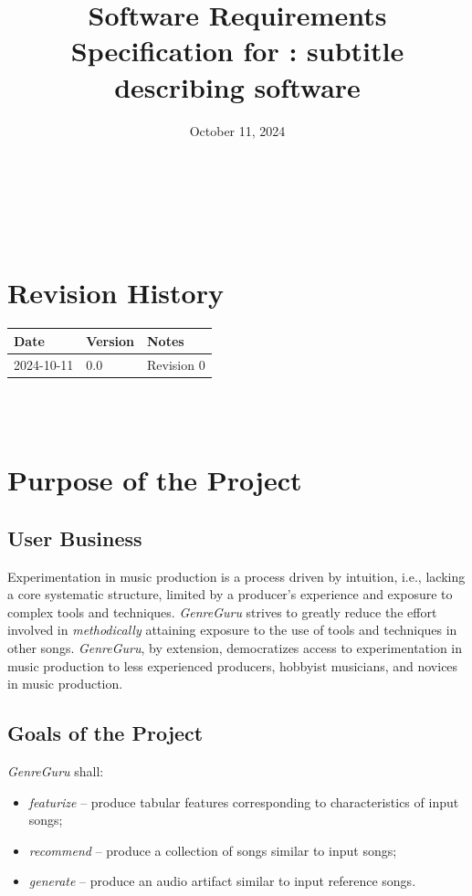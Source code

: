 \documentclass[12pt]{article}
\begin{document}
\title{Software Requirements Specification for \progname: subtitle describing software} 
\author{\authname}
\date{October 11, 2024}
	
\maketitle

~\newpage


\tableofcontents

~\newpage

\section*{Revision History}

\begin{tabularx}{\textwidth}{p{3cm}p{2cm}X}
\toprule {\textbf{Date}} & {\textbf{Version}} & {\textbf{Notes}}\\
\midrule
2024-10-11 & 0.0 & Revision 0\\
\bottomrule
\end{tabularx}

~\\

~\newpage
\section{Purpose of the Project}
\subsection{User Business}
Experimentation in music production is a process driven by intuition, i.e., lacking a core systematic structure, limited by a producer's experience and exposure to complex tools and techniques. \emph{GenreGuru} strives to greatly reduce the effort involved in \emph{methodically} attaining exposure to the use of tools and techniques in other songs. \emph{GenreGuru}, by extension, democratizes access to experimentation in music production to less experienced producers, hobbyist musicians, and novices in music production.
\subsection{Goals of the Project}
\emph{GenreGuru} shall:
\begin{itemize}
  \item \emph{featurize} -- produce tabular features corresponding to characteristics of input songs;
  \item \emph{recommend} -- produce a collection of songs similar to input songs;
  \item \emph{generate} -- produce an audio artifact similar to input reference songs.
\end{itemize}
\end{document}
